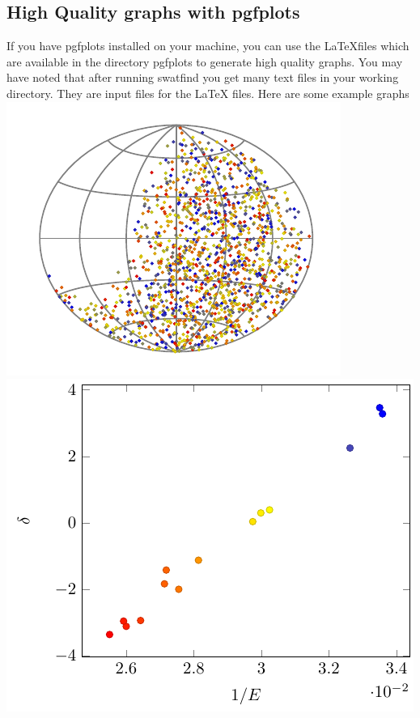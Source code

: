 \documentclass[12pt]{article}
\begin{document}
\subsection{High Quality graphs with pgfplots} \label{ch::pgfplots}
If you have pgfplots installed on your machine, you can use the \LaTeX files
which are available in the directory pgfplots to generate high quality
graphs. You may have noted that after running {\color{brown}swatfind} you get
many text files in your working directory. They are input files for the \LaTeX
files. Here are some example graphs \\
\vspace{1cm}
\includegraphics[scale=0.5]{skymap.pdf} \hfill
\includegraphics[scale=0.5]{corr_graph.pdf} \hfill
\end{document}
